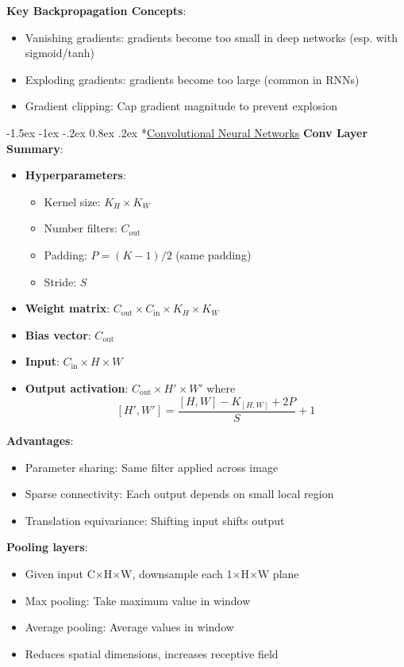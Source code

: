 \documentclass{article}
\makeatletter
\renewcommand\section{\@startsection{section}{1}{\z@}%
                                  {-1.5ex \@plus -1ex \@minus -.2ex}%
                                  {0.8ex \@plus.2ex}%
                                  {\normalfont\small\bfseries}}
\makeatother
\begin{document}
\begin{multicols}{3}
\textbf{Key Backpropagation Concepts}:
\begin{itemize}
\item Vanishing gradients: gradients become too small in deep networks (esp. with sigmoid/tanh)
\item Exploding gradients: gradients become too large (common in RNNs)
\item Gradient clipping: Cap gradient magnitude to prevent explosion
\end{itemize}

\section*{\underline{Convolutional Neural Networks}}
\textbf{Conv Layer Summary}:
\begin{itemize}
\item \textbf{Hyperparameters}:
\begin{itemize}
\item Kernel size: $K_H \times K_W$
\item Number filters: $C_{\text{out}}$
\item Padding: $P = (K-1)/2$ (same padding)
\item Stride: $S$
\end{itemize}
\item \textbf{Weight matrix}: $C_{\text{out}} \times C_{\text{in}} \times K_H \times K_W$
\item \textbf{Bias vector}: $C_{\text{out}}$
\item \textbf{Input}: $C_{\text{in}} \times H \times W$
\item \textbf{Output activation}: $C_{\text{out}} \times H' \times W'$ where
$$
[H', W'] = \frac{[H, W] - K_{[H, W]} + 2P}{S} + 1
$$
\end{itemize}

\textbf{Advantages}:
\begin{itemize}
\item Parameter sharing: Same filter applied across image
\item Sparse connectivity: Each output depends on small local region
\item Translation equivariance: Shifting input shifts output
\end{itemize}

\textbf{Pooling layers}: 
\begin{itemize}
\item Given input C×H×W, downsample each 1×H×W plane
\item Max pooling: Take maximum value in window
\item Average pooling: Average values in window
\item Reduces spatial dimensions, increases receptive field
\end{itemize}


\end{multicols}
\end{document}
